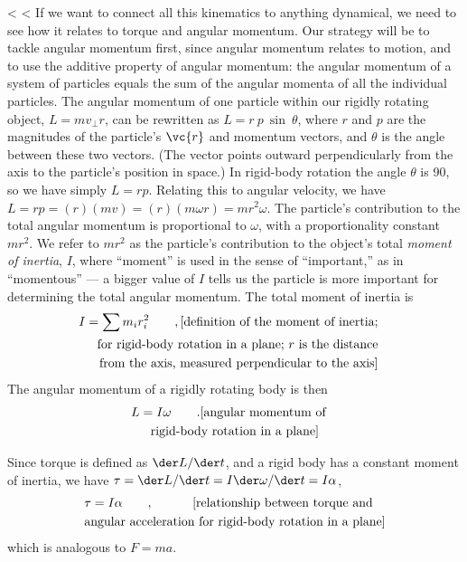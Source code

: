 <%
<%
If we want to connect all this kinematics to anything
dynamical, we need to see how it relates to torque and
angular momentum. Our strategy will be to tackle angular
momentum first, since angular momentum relates to motion,
and to use the additive property of angular momentum: the
angular momentum of a system of particles equals the sum of
the angular momenta of all the individual particles. The
angular momentum of one particle within our
rigidly rotating object, $L=mv_\perp r$, can be rewritten as
$L=r\:p\:\sin\:\theta$, where $r$ and $p$ are the
magnitudes of the particle's $\vc{r}$ and momentum vectors, and $\theta$
is the angle between these two vectors. (The  vector points
outward perpendicularly from the axis to the particle's
position in space.) In rigid-body rotation the angle $\theta$ is
90\degunit, so we have simply $L=r p$. Relating this to angular
velocity, we have $L=rp=(r)(mv)=(r)(m\omega r)=mr^2\omega$. The particle's
contribution to the total angular momentum is proportional
to $\omega$, with a proportionality constant $mr^2$. We refer to $mr^2$
as the particle's contribution to the object's total \emph{moment
of inertia},
 $I$, where ``moment'' is used in the sense of
``important,'' as in ``momentous''  --- a bigger value of $I$
tells us the particle is more important for determining the
total angular momentum. The total moment of inertia
is
\begin{multline*}
        I        =          \sum{m_i r_i^2} \qquad ,
                 \hfill \shoveright{\text{[definition of the moment of inertia;}} \\
                \hfill \shoveright{\text{for rigid-body
                rotation in a plane; $r$ is the distance}}\\
                \hfill \shoveright{\text{from the axis, measured perpendicular
                to the axis]}}
\end{multline*}
The angular momentum of a rigidly rotating body is then
\begin{multline*}
        L        =  I \omega \qquad . \hfill
                        \shoveright{\text{[angular momentum of}}\\
        \text{rigid-body rotation in a plane]}
\end{multline*}

Since torque is defined as $\der L/\der t$, and a rigid body has
a constant moment of inertia, we have $\tau=\der L/\der t
=I\der\omega/\der t=I\alpha$,
\begin{multline*}
        \tau        =  I \alpha \qquad   ,        \hfill
                \shoveright{\text{[relationship between torque and}}\\
        \text{angular acceleration for rigid-body rotation in a plane]}
\end{multline*}
which is analogous to $F=ma$.

